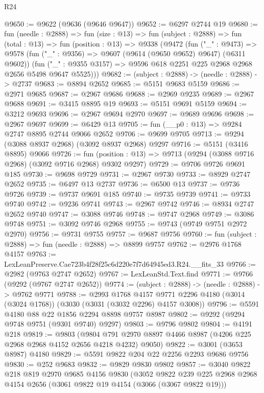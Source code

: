 \begin{lexlean}{R24}
\begin{coremodule}
@9650 := @9622 (@9636 (@9646 @9647))
@9652 := @6297 @2744 @19
@9680 := fun (needle : @2888) =>
  fun (size : @13) =>
  fun (subject : @2888) =>
  fun (total : @13) =>
  fun (position : @13) =>
  @9338
    (@9472
      (fun ("_" : @9473) =>
      @9578
        (fun ("_" : @9356) => @9607 (@9614 (@9650 @9652) @9647) (@6311 @9602))
        (fun ("_" : @9355 @3157) => @9596 @618 @2251 @225 @2968 @2968 @2656 @5498 @9647 @5525)))
@9682 := (subject : @2888) -> (needle : @2888) -> @2737
@9683 := @8894 @2652
@9685 := @5151 @9683 @5159
@9686 := @2971 @9685
@9687 := @2967 @9686
@9688 := @2969 @9235
@9689 := @2967 @9688
@9691 := @3415 @8895 @19
@9693 := @5151 @9691 @5159
@9694 := @3212 @9693
@9696 := @2967 @9694 @2970
@9697 := @9689 @9696
@9698 := @2967 @9697
@9699 := @6429 @13
@9705 := fun (__p0 : @13) => @9284 @2747 @8895 @2744 @9066 @2652
@9706 := @9699 @9705
@9713 := @9294 (@3088 @8937 @2968) (@3092 @8937 @2968) @9297
@9716 := @5151 (@3416 @8895) @9066
@9726 := fun (position : @13) => @9713 (@9294 (@3088 @9716 @2968) (@3092 @9716 @2968) @9302 @9297)
@9729 := @9706 @9726 @9691 @185
@9730 := @9698 @9729
@9731 := @2967 @9730
@9733 := @8929 @2747 @2652
@9735 := @6497 @13 @2737
@9736 := @6500 @13
@9737 := @9736 @9726
@9739 := @9737 @9691 @185
@9740 := @9735 @9739
@9741 := @9733 @9740
@9742 := @9236 @9741
@9743 := @2967 @9742
@9746 := @8934 @2747 @2652 @9740
@9747 := @3088 @9746
@9748 := @9747 @2968
@9749 := @3086 @9748
@9751 := @3092 @9746 @2968
@9755 := @9743 (@9749 @9751 @2972 @2970)
@9756 := @9731 @9755
@9757 := @9687 @9756
@9760 := fun (subject : @2888) => fun (needle : @2888) => @8899 @9757
@9762 := @2976 @1768 @4157
@9763 := LexLeanPreserve.Cae723b4f28f25c6d220e7f7d64945ed3.R24.__fits_33
@9766 := @2982 (@9763 @2747 @2652)
@9767 := LexLeanStd.Text.find
@9771 := @9766 (@9292 (@9767 @2747 @2652))
@9774 := (subject : @2888) -> (needle : @2888) -> @9762 @9771
@9788 := @2993
    @1768
    @4157
    @9771
    @2296
    @4180
    (@3014 (@3024 @1768))
    (@3030 (@3031 (@3032 @2296) @4157 @3008))
@9796 := @5591 @4180 @88 @22 @1856 @2294 @8898 @9757 @8987
@9802 := @9292 (@9294 @9748 @9751 (@9301 @9740) @9297)
@9803 := @9796 @9802
@9804 := @4191 @218
@9819 := @9803
    (@9804 @791 @2970 @8897 @4466 @8987 (@4206 @225 @2968 @2968 @4152 @2656 @4218 @4232) @9050)
@9822 := @3001 (@3653 @8987) @4180
@9829 := @5591 @9822 @204 @22 @2256 @2293 @9686 @9756
@9830 := @252 @9683
@9832 := @9829 @9830 @9802
@9857 := @3040
    @9822
    @218
    @819
    @2970
    @9685
    @4156
    @9830
    (@3052
      @9822
      @239
      @225
      @2968
      @2968
      @4154
      @2656
      (@3061 @9822 @19 @4154 (@3066 (@3067 @9822 @19)))

\end{coremodule}
\end{lexlean}
